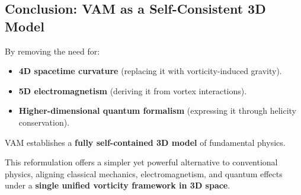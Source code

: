 \subsection{Conclusion: VAM as a Self-Consistent 3D Model}
By removing the need for:
\begin{itemize}
    \item \textbf{4D spacetime curvature} (replacing it with vorticity-induced gravity).
    \item \textbf{5D electromagnetism} (deriving it from vortex interactions).
    \item \textbf{Higher-dimensional quantum formalism} (expressing it through helicity conservation).
\end{itemize}
VAM establishes a \textbf{fully self-contained 3D model} of fundamental physics.

This reformulation offers a simpler yet powerful alternative to conventional physics, aligning classical mechanics, electromagnetism, and quantum effects under a \textbf{single unified vorticity framework in 3D space}.
